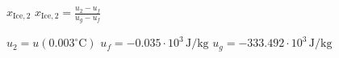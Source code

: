 \( x_{\text{Ice},2} \)  
\( x_{\text{Ice},2} = \frac{u_2 - u_f}{u_g - u_f} \)  

\( u_2 = u(0.003^\circ \text{C}) \)  
\( u_f = -0.035 \cdot 10^3 \, \text{J/kg} \)  
\( u_g = -333.492 \cdot 10^3 \, \text{J/kg} \)